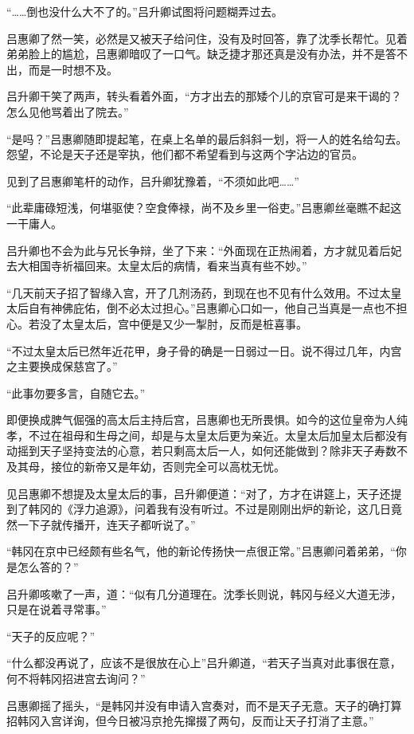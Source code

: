 “……倒也没什么大不了的。”吕升卿试图将问题糊弄过去。

吕惠卿了然一笑，必然是又被天子给问住，没有及时回答，靠了沈季长帮忙。见着弟弟脸上的尴尬，吕惠卿暗叹了一口气。缺乏捷才那还真是没有办法，并不是答不出，而是一时想不及。

吕升卿干笑了两声，转头看着外面，“方才出去的那矮个儿的京官可是来干谒的？怎么见他骂着出了院去。”

“是吗？”吕惠卿随即提起笔，在桌上名单的最后斜斜一划，将一人的姓名给勾去。怨望，不论是天子还是宰执，他们都不希望看到与这两个字沾边的官员。

见到了吕惠卿笔杆的动作，吕升卿犹豫着，“不须如此吧……”

“此辈庸碌短浅，何堪驱使？空食俸禄，尚不及乡里一俗吏。”吕惠卿丝毫瞧不起这一干庸人。

吕升卿也不会为此与兄长争辩，坐了下来：“外面现在正热闹着，方才就见着后妃去大相国寺祈福回来。太皇太后的病情，看来当真有些不妙。”

“几天前天子招了智缘入宫，开了几剂汤药，到现在也不见有什么效用。不过太皇太后自有神佛庇佑，倒不必太过担心。”吕惠卿心口如一，他自己当真是一点也不担心。若没了太皇太后，宫中便是又少一掣肘，反而是桩喜事。

“不过太皇太后已然年近花甲，身子骨的确是一日弱过一日。说不得过几年，内宫之主要换成保慈宫了。”

“此事勿要多言，自随它去。”

即便换成脾气倔强的高太后主持后宫，吕惠卿也无所畏惧。如今的这位皇帝为人纯孝，不过在祖母和生母之间，却是与太皇太后更为亲近。太皇太后加皇太后都没有动摇到天子坚持变法的心意，若只剩高太后一人，如何还能做到？除非天子寿数不及其母，接位的新帝又是年幼，否则完全可以高枕无忧。

见吕惠卿不想提及太皇太后的事，吕升卿便道：“对了，方才在讲筵上，天子还提到了韩冈的《浮力追源》，问着我有没有听过。不过是刚刚出炉的新论，这几日竟然一下子就传播开，连天子都听说了。”

“韩冈在京中已经颇有些名气，他的新论传扬快一点很正常。”吕惠卿问着弟弟，“你是怎么答的？”

吕升卿咳嗽了一声，道：“似有几分道理在。沈季长则说，韩冈与经义大道无涉，只是在说着寻常事。”

“天子的反应呢？”

“什么都没再说了，应该不是很放在心上”吕升卿道，“若天子当真对此事很在意，何不将韩冈招进宫去询问？”

吕惠卿摇了摇头，“是韩冈并没有申请入宫奏对，而不是天子无意。天子的确打算招韩冈入宫详询，但今日被冯京抢先撺掇了两句，反而让天子打消了主意。”

